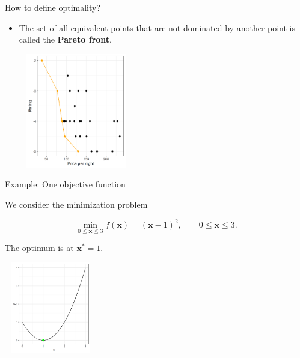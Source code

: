 \documentclass[11pt,compress,t,notes=noshow, xcolor=table]{beamer}
\begin{document}
\begin{vbframe}{How to define optimality?}
\framebreak

\begin{itemize}
\item The set of all equivalent points that are not dominated by another point is called the \textbf{Pareto front}.



\vspace*{0.3cm}

\lz
\begin{center}
\includegraphics[width = 5cm, height = 5cm ]{figure_man/pareto.png}
\end{center}

\end{itemize}

\end{vbframe}


\begin{vbframe}{Example: One objective function}

We consider the minimization problem

$$
\min_{0 \le \bm{x} \le 3} f(\bm{x}) = (\bm{x} - 1)^2, \qquad 0 \le \bm{x} \le 3.
$$

The optimum is at $\bm{x}^* = 1$.

\lz

\begin{center}
\includegraphics[width = 4cm, height = 4cm ]{figure_man/one-obj-func.png}
\end{center}

\end{vbframe}
\end{document}
